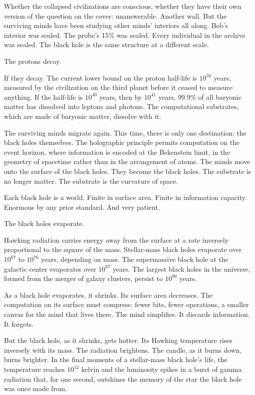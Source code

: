 Whether the collapsed civilizations are conscious, whether they have their own version of the question on the cover: unanswerable. Another wall. But the surviving minds have been studying other minds' interiors all along. Bob's interior was sealed. The probe's 15\% was sealed. Every individual in the archive was sealed. The black hole is the same structure at a different scale.

\bigskip

The protons decay.

If they decay. The current lower bound on the proton half-life is $10^{34}$ years, measured by the civilization on the third planet before it ceased to measure anything. If the half-life is $10^{40}$ years, then by $10^{41}$ years, 99.9\% of all baryonic matter has dissolved into leptons and photons. The computational substrates, which are made of baryonic matter, dissolve with it.

The surviving minds migrate again. This time, there is only one destination: the black holes themselves. The holographic principle permits computation on the event horizon, where information is encoded at the Bekenstein limit, in the geometry of spacetime rather than in the arrangement of atoms. The minds move onto the surface of the black holes. They become the black holes. The substrate is no longer matter. The substrate is the curvature of space.

Each black hole is a world. Finite in surface area. Finite in information capacity. Enormous by any prior standard. And very patient.

\bigskip

The black holes evaporate.

Hawking radiation carries energy away from the surface at a rate inversely proportional to the square of the mass. Stellar-mass black holes evaporate over $10^{67}$ to $10^{76}$ years, depending on mass. The supermassive black hole at the galactic center evaporates over $10^{87}$ years. The largest black holes in the universe, formed from the merger of galaxy clusters, persist to $10^{99}$ years.

As a black hole evaporates, it shrinks. Its surface area decreases. The computation on its surface must compress: fewer bits, fewer operations, a smaller canvas for the mind that lives there. The mind simplifies. It discards information. It forgets.

But the black hole, as it shrinks, gets hotter. Its Hawking temperature rises inversely with its mass. The radiation brightens. The candle, as it burns down, burns brighter. In the final moments of a stellar-mass black hole's life, the temperature reaches $10^{12}$ kelvin and the luminosity spikes in a burst of gamma radiation that, for one second, outshines the memory of the star the black hole was once made from.

